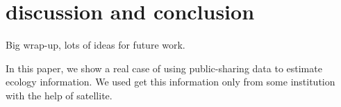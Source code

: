 \documentclass[10pt,journal,compsoc]{IEEEtran}
\begin{document}
%
%














%
%
%

\section{discussion and conclusion}




Big wrap-up, lots of ideas for future work.

In this paper, we show a real case of using public-sharing data to estimate ecology information.
We used get this information only from some institution with the help of satellite.
\end{document}
